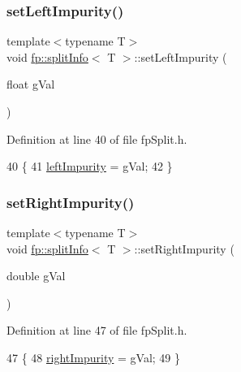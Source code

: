 \subsubsection{\texorpdfstring{set\+Left\+Impurity()}{setLeftImpurity()}}
{\footnotesize\ttfamily template$<$typename T$>$ \\
void \hyperlink{classfp_1_1splitInfo}{fp\+::split\+Info}$<$ T $>$\+::set\+Left\+Impurity (\begin{DoxyParamCaption}\item[{float}]{g\+Val }\end{DoxyParamCaption})\hspace{0.3cm}{\ttfamily [inline]}}



Definition at line 40 of file fp\+Split.\+h.


\begin{DoxyCode}
40                                                        \{
41                 \hyperlink{classfp_1_1splitInfo_a07ad3b8d248d48e3157aa44a2452bc8c}{leftImpurity} = gVal;
42                 \}
\end{DoxyCode}
\mbox{\label{classfp_1_1splitInfo_a495129a74f5f234ab4b412eab5f929dc}} 
\subsubsection{\texorpdfstring{set\+Right\+Impurity()}{setRightImpurity()}}
{\footnotesize\ttfamily template$<$typename T$>$ \\
void \hyperlink{classfp_1_1splitInfo}{fp\+::split\+Info}$<$ T $>$\+::set\+Right\+Impurity (\begin{DoxyParamCaption}\item[{double}]{g\+Val }\end{DoxyParamCaption})\hspace{0.3cm}{\ttfamily [inline]}}



Definition at line 47 of file fp\+Split.\+h.


\begin{DoxyCode}
47                                                          \{
48                 \hyperlink{classfp_1_1splitInfo_ac70a7dadd873d5bb1535fb0e5bea45fc}{rightImpurity} = gVal;
49                 \}
\end{DoxyCode}
\mbox{\label{classfp_1_1splitInfo_afeb499dae144aa8e8d55ef5fe206bb3c}} 
